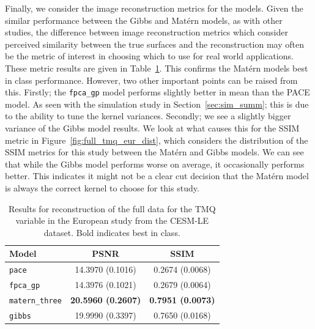 Finally, we consider the image reconstruction metrics for the models.
Given the similar performance between the Gibbs and Mat\'ern models, as with other studies, the difference between image reconstruction metrics which consider perceived similarity between the true surfaces and the reconstruction may often be the metric of interest in choosing which to use for real world applications.
These metric results are given in Table~\ref{tab:full_cesm_tmq_eur}.
This confirms the Mat\'ern models best in class performance.
However, two other important points can be raised from this.
Firstly; the \verb*|fpca_gp| model performs slightly better in mean than the PACE model.
As seen with the simulation study in Section~\ref{sec:sim_summ}; this is due to  the ability to tune the kernel variances. 
Secondly; we see a slightly bigger variance of the Gibbs model results.
We look at what causes this for the SSIM metric in Figure~\ref{fig:full_tmq_eur_dist}, which considers the distribution of the SSIM metrics for this study between the Mat\'ern and Gibbs models.
We can see that while the Gibbs model performs worse on average, it occasionally performs better.
This indicates it might not be a clear cut decision that the Mat\'ern model is always the correct kernel to choose for this study.

\begin{table}
	\caption[Results for TMQ variable on full data in the European study]{Results for reconstruction of the full data for the TMQ variable in the European study from the CESM-LE dataset. Bold indicates best in class.}
	\centering
	\label{tab:full_cesm_tmq_eur}
	\begin{tabular}{lcc}
		\toprule
		\textbf{Model} & \textbf{PSNR} & \textbf{SSIM} \\
		\midrule
		\verb*|pace| & 14.3970 (0.1016) & 0.2674 (0.0068) \\
		\verb*|fpca_gp| & 14.3976 (0.1021) & 0.2679	(0.0064) \\
		\verb*|matern_three| & \textbf{20.5960 (0.2607)}& \textbf{0.7951 (0.0073)}\\
		\verb*|gibbs| & 19.9990	(0.3397)& 0.7650 (0.0168)\\
		\bottomrule
	\end{tabular}
\end{table}

